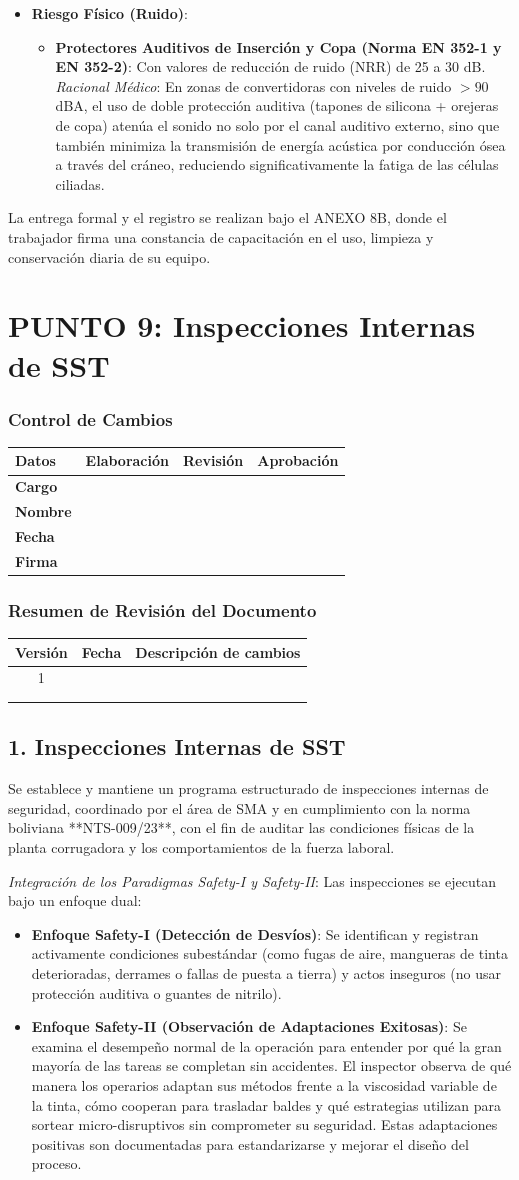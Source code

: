 \documentclass[11pt, letterpaper]{article}
\newcommand{\controlcambios}{
    \subsubsection*{Control de Cambios}
    \begin{table}[H]
        \centering
        \small
        \begin{tabular}{lp{4cm}p{4cm}p{4cm}}
            \toprule
            \textbf{Datos} & \textbf{Elaboración} & \textbf{Revisión} & \textbf{Aprobación} \\
            \midrule
            \textbf{Cargo} & & & \\
            \textbf{Nombre} & & & \\
            \textbf{Fecha} & & & \\
            \textbf{Firma} & & & \\
            \bottomrule
        \end{tabular}
    \end{table}
}
\newcommand{\resumenrevision}[1]{
    \subsubsection*{Resumen de Revisión del Documento}
    \begin{table}[H]
        \centering
        \small
        \begin{tabular}{ccp{8cm}}
            \toprule
            \textbf{Versión} & \textbf{Fecha} & \textbf{Descripción de cambios} \\
            \midrule
            #1 & & \\
            & & \\
            & & \\
            \bottomrule
        \end{tabular}
    \end{table}
}
\begin{document}
\begin{itemize}
    \item \textbf{Riesgo Físico (Ruido)}:
    \begin{itemize}
        \item \textbf{Protectores Auditivos de Inserción y Copa (Norma EN 352-1 y EN 352-2)}: Con valores de reducción de ruido (NRR) de 25 a 30 dB. \textit{Racional Médico}: En zonas de convertidoras con niveles de ruido $>90$ dBA, el uso de doble protección auditiva (tapones de silicona + orejeras de copa) atenúa el sonido no solo por el canal auditivo externo, sino que también minimiza la transmisión de energía acústica por conducción ósea a través del cráneo, reduciendo significativamente la fatiga de las células ciliadas.
    \end{itemize}
\end{itemize}

La entrega formal y el registro se realizan bajo el ANEXO 8B, donde el trabajador firma una constancia de capacitación en el uso, limpieza y conservación diaria de su equipo.
\newpage
\section{PUNTO 9: Inspecciones Internas de SST}
\controlcambios
\resumenrevision{1}
\subsection{1. Inspecciones Internas de SST}
Se establece y mantiene un programa estructurado de inspecciones internas de seguridad, coordinado por el área de SMA y en cumplimiento con la norma boliviana **NTS-009/23**, con el fin de auditar las condiciones físicas de la planta corrugadora y los comportamientos de la fuerza laboral.

\textit{Integración de los Paradigmas Safety-I y Safety-II}: Las inspecciones se ejecutan bajo un enfoque dual:
\begin{itemize}
    \item \textbf{Enfoque Safety-I (Detección de Desvíos)}: Se identifican y registran activamente condiciones subestándar (como fugas de aire, mangueras de tinta deterioradas, derrames o fallas de puesta a tierra) y actos inseguros (no usar protección auditiva o guantes de nitrilo).
    \item \textbf{Enfoque Safety-II (Observación de Adaptaciones Exitosas)}: Se examina el desempeño normal de la operación para entender por qué la gran mayoría de las tareas se completan sin accidentes. El inspector observa de qué manera los operarios adaptan sus métodos frente a la viscosidad variable de la tinta, cómo cooperan para trasladar baldes y qué estrategias utilizan para sortear micro-disruptivos sin comprometer su seguridad. Estas adaptaciones positivas son documentadas para estandarizarse y mejorar el diseño del proceso.
\end{itemize}
\end{document}
